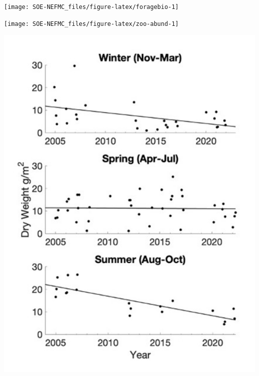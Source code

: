 \documentclass[
  10pt,
]{article}
\let\origfigure\figure
\let\endorigfigure\endfigure
\renewenvironment{figure}[1][2] {
    \expandafter\origfigure\expandafter[H]
} {
    \endorigfigure
}
\begin{document}
\begin{figure}

{\centering \texttt{[image: SOE-NEFMC\_files/figure-latex/foragebio-1]} 

}

\caption{Forage fish index in GB (left) and GOM (right) for spring (blue) and fall (red) surveys. Index values are relative to the maximum observation within a region across surveys.}\label{fig:foragebio}
\end{figure}
\begin{figure}

{\centering \texttt{[image: SOE-NEFMC\_files/figure-latex/zoo-abund-1]} 

}

\caption{Georges Bank (GB) and Gulf of Maine (GOM) abundance anomalies three dominant zooplankton (\textit{Calanus finmarchicus}, \textit{Calanus typicus}, and \textit{Pseudocalanus spp}.).}\label{fig:zoo-abund}
\end{figure}
\begin{figure}

{\centering \includegraphics[width=5.92in]{SOE-NEFMC_files/figure-latex/zooplankton-season-1} 

}

\caption{Dry mass of mesozooplankton captured with a 200µm ring net towed from the bottom to surface at a deep time series station  in Wilkinson Basin between 2005-2022 (Runge et al. 2023).}\label{fig:zooplankton-season}
\end{figure}
\end{document}
